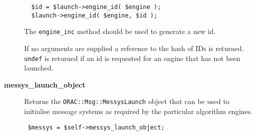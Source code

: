 \begin{description}
\begin{verbatim}
  $id = $launch->engine_id( $engine );
  $launch->engine_id( $engine, $id );
\end{verbatim}


The \texttt{engine\_inc} method should be used to generate a new id.



If no arguments are supplied a reference to the hash of IDs is
returned. \texttt{undef} is returned if an id is requested for an
engine that has not been launched.


\item[\textbf{messys\_launch\_object}] \mbox{}

Returns the \texttt{ORAC::Msg::MessysLaunch} object that can be used
to initialise message systems as required by the particular
algorithm engines.

\begin{verbatim}
 $messys = $self->messys_launch_object;
\end{verbatim}
\end{description}
